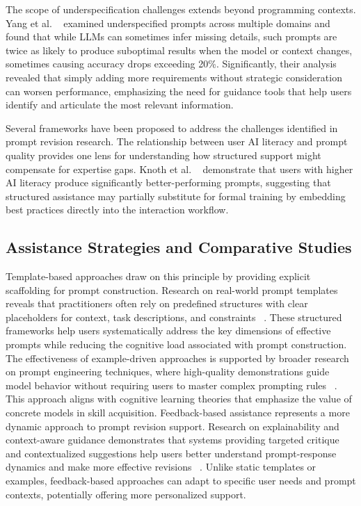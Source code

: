 The scope of underspecification challenges extends beyond programming contexts. Yang et al. ~\cite{Yang2025Underspecified} examined underspecified prompts across multiple domains and found that while LLMs can sometimes infer missing details, such prompts are twice as likely to produce suboptimal results when the model or context changes, sometimes causing accuracy drops exceeding 20\%. Significantly, their analysis revealed that simply adding more requirements without strategic consideration can worsen performance, emphasizing the need for guidance tools that help users identify and articulate the most relevant information.

Several frameworks have been proposed to address the challenges identified in prompt revision research. The relationship between user AI literacy and prompt quality provides one lens for understanding how structured support might compensate for expertise gaps. Knoth et al. ~\cite{Knoth2024AI} demonstrate that users with higher AI literacy produce significantly better-performing prompts, suggesting that structured assistance may partially substitute for formal training by embedding best practices directly into the interaction workflow.

\subsection{\textbf{Assistance Strategies and Comparative Studies}}
Template-based approaches draw on this principle by providing explicit scaffolding for prompt construction. Research on real-world prompt templates reveals that practitioners often rely on predefined structures with clear placeholders for context, task descriptions, and constraints ~\cite{Mao2025Prompts}. These structured frameworks help users systematically address the key dimensions of effective prompts while reducing the cognitive load associated with prompt construction. The effectiveness of example-driven approaches is supported by broader research on prompt engineering techniques, where high-quality demonstrations guide model behavior without requiring users to master complex prompting rules ~\cite{Chen2023Unleashing}. This approach aligns with cognitive learning theories that emphasize the value of concrete models in skill acquisition. Feedback-based assistance represents a more dynamic approach to prompt revision support. Research on explainability and context-aware guidance demonstrates that systems providing targeted critique and contextualized suggestions help users better understand prompt-response dynamics and make more effective revisions ~\cite{Mao2025Prompts}. Unlike static templates or examples, feedback-based approaches can adapt to specific user needs and prompt contexts, potentially offering more personalized support.



